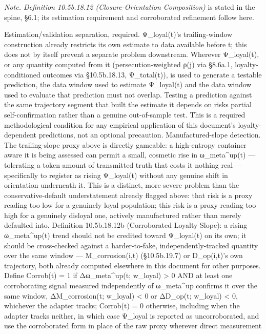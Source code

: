 \documentclass[
]{article}
\begin{document}
\emph{Note. Definition 10.5b.18.12 (Closure-Orientation Composition)} is
stated in the spine, §6.1; its estimation requirement and corroborated
refinement follow here.

Estimation/validation separation, required. Ψ\_loyal(t)'s
trailing-window construction already restricts its own estimate to data
available before t; this does not by itself prevent a separate problem
downstream. Wherever Ψ\_loyal(t), or any quantity computed from it
(persecution-weighted ρ(j) via §8.6a.1, loyalty-conditioned outcomes via
§10.5b.18.13, Ψ\_total(t)), is used to generate a testable prediction,
the data window used to estimate Ψ\_loyal(t) and the data window used to
evaluate that prediction must not overlap. Testing a prediction against
the same trajectory segment that built the estimate it depends on risks
partial self-confirmation rather than a genuine out-of-sample test. This
is a required methodological condition for any empirical application of
this document's loyalty-dependent predictions, not an optional
precaution. Manufactured-slope detection. The trailing-slope proxy above
is directly gameable: a high-entropy container aware it is being
assessed can permit a small, cosmetic rise in ω\_meta\^{}up(t) ---
tolerating a token amount of transmitted truth that costs it nothing
real --- specifically to register as rising Ψ\_loyal(t) without any
genuine shift in orientation underneath it. This is a distinct, more
severe problem than the conservative-default understatement already
flagged above: that risk is a proxy reading too low for a genuinely
loyal population; this risk is a proxy reading too high for a genuinely
disloyal one, actively manufactured rather than merely defaulted into.
Definition 10.5b.18.12b (Corroborated Loyalty Slope): a rising
ω\_meta\^{}up(t) trend should not be credited toward Ψ\_loyal(t) on its
own; it should be cross-checked against a harder-to-fake,
independently-tracked quantity over the same window ---
M\_corrosion(i,t) (§10.5b.19.7) or D\_op(i,t)'s own trajectory, both
already computed elsewhere in this document for other purposes. Define
Corrob(t) = 1 if Δω\_meta\^{}up(t; w\_loyal) \textgreater{} 0 AND at
least one corroborating signal measured independently of ω\_meta\^{}up
confirms it over the same window, ΔM\_corrosion(t; w\_loyal) \textless{}
0 or ΔD\_op(t; w\_loyal) \textless{} 0, whichever the adapter tracks;
Corrob(t) = 0 otherwise, including when the adapter tracks neither, in
which case Ψ\_loyal is reported as uncorroborated, and use the
corroborated form in place of the raw proxy wherever direct measurement
\end{document}
